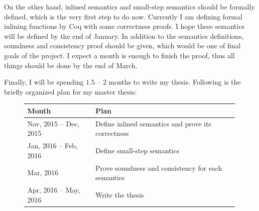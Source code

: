 On the other hand, inlined semantics and small-step semantics should
be formally defined, which is the very first step to do now. Currently
I am defining formal inlining functions by Coq with some correctness
proofs. I hope these semantics will be defined by the end of
January. In addition to the semantics definitions, soundness and
consistency proof should be given, which would be one of final goals
of the project. I expect a month is enough to finish the proof, thus
all things should be done by the end of March.

Finally, I will be spending $1.5$ -- $2$ months to write my thesis.
Following is the briefly organized plan for my master thesis:

\begin{figure}[h]
  \begin{center}
    \begin{tabular}{l|l}
      \hline
      Month & Plan \\
      \hline
      Nov, 2015 -- Dec, 2015 & Define inlined semantics and prove its correctness \\
      Jan, 2016 -- Feb, 2016 & Define small-step semantics \\
      Mar, 2016 & Prove soundness and consistency for each semantics \\
      Apr, 2016 -- May, 2016 & Write the thesis \\
      \hline
    \end{tabular}
  \end{center}
\end{figure}
